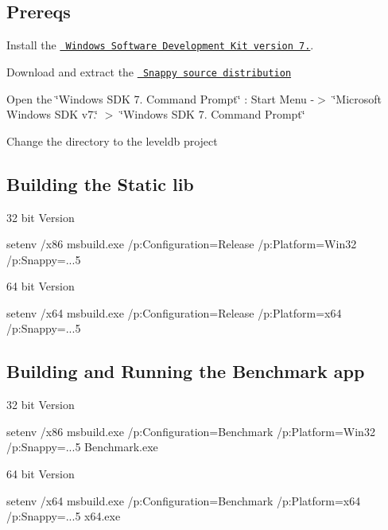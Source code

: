 \subsection*{Prereqs}

Install the \href{http://www.microsoft.com/downloads/dlx/en-us/listdetailsview.aspx?FamilyID=6b6c21d2-2006-4afa-9702-529fa782d63b}{\texttt{ Windows Software Development Kit version 7.}}.

Download and extract the \href{http://snappy.googlecode.com/files/snappy-1.0.5.tar.gz}{\texttt{ Snappy source distribution}}


\begin{DoxyEnumerate}
\item Open the \char`\"{}\+Windows S\+D\+K 7. Command Prompt\char`\"{} \+: Start Menu -\/$>$ \char`\"{}\+Microsoft Windows S\+D\+K v7.\char`\"{} $>$ \char`\"{}\+Windows S\+D\+K 7. Command Prompt\char`\"{}
\item Change the directory to the leveldb project
\end{DoxyEnumerate}

\subsection*{Building the Static lib}


\begin{DoxyItemize}
\item 32 bit Version \begin{DoxyVerb}  setenv /x86
  msbuild.exe /p:Configuration=Release /p:Platform=Win32 /p:Snappy=...5
\end{DoxyVerb}

\item 64 bit Version \begin{DoxyVerb}  setenv /x64
  msbuild.exe /p:Configuration=Release /p:Platform=x64 /p:Snappy=...5
\end{DoxyVerb}

\end{DoxyItemize}

\subsection*{Building and Running the Benchmark app}


\begin{DoxyItemize}
\item 32 bit Version \begin{DoxyVerb}  setenv /x86
  msbuild.exe /p:Configuration=Benchmark /p:Platform=Win32 /p:Snappy=...5
  Benchmark\leveldb.exe
\end{DoxyVerb}

\item 64 bit Version \begin{DoxyVerb}  setenv /x64
  msbuild.exe /p:Configuration=Benchmark /p:Platform=x64 /p:Snappy=...5
  x64\Benchmark\leveldb.exe
\end{DoxyVerb}
 
\end{DoxyItemize}